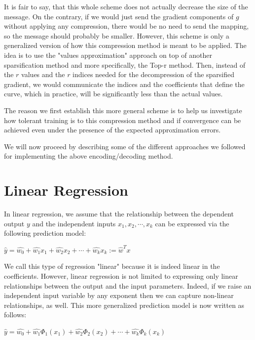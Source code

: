     It is fair to say, that this whole scheme does not actually decrease the size of the message. On the contrary, if we would just send the gradient components of $g$ without applying any compression, there would be no need to send the mapping, so the message should probably be smaller.
    However, this scheme is only a generalized version of how this compression method is meant to be applied.
    The idea is to use the "values approximation" approach on top of another sparsification method and more specifically, the Top-r method.
    Then, instead of the $r$ values and the $r$ indices needed for the decompression of the sparsified gradient, we would communicate the indices and the coefficients that define the curve, which in practice, will be significantly less than the actual values.
    
    The reason we first establish this more general scheme is to help us investigate how tolerant training is to this compression method and if convergence can be achieved even under the presence of the expected approximation errors.
    
    We will now proceed by describing some of the different approaches we followed for implementing the above encoding/decoding method.


    \section{Linear Regression}
    In linear regression, we assume that the relationship between the dependent output $y$ and the independent inputs  $x_1, x_2, \cdots, x_k$ can be expressed via the following prediction model:
    \begin{flushleft}
    \centering
    \setlength{\parindent}{40ex} 
    $\hat{y} = \hat{w_0} + \hat{w_1}x_1 +  \hat{w_2}x_2 + \cdots + \hat{w_k}x_k := \hat{w}^T x$
    \end{flushleft}
    
    We call this type of regression "linear" because it is indeed linear in the coefficients.
    However, linear regression is not limited to expressing only linear relationships between the output and the input parameters. 
    Indeed, if we raise an independent input variable by any exponent then we can capture non-linear relationships, as well.
    This more generalized prediction model is now written  as follows:
    \begin{flushleft}
    \centering
    \setlength{\parindent}{40ex} 
    $\hat{y} = \hat{w_0} + \hat{w_1}\Phi_1(x_1) +  \hat{w_2}\Phi_2(x_2) + \cdots + \hat{w_k}\Phi_k(x_k)$
    \end{flushleft}
    
